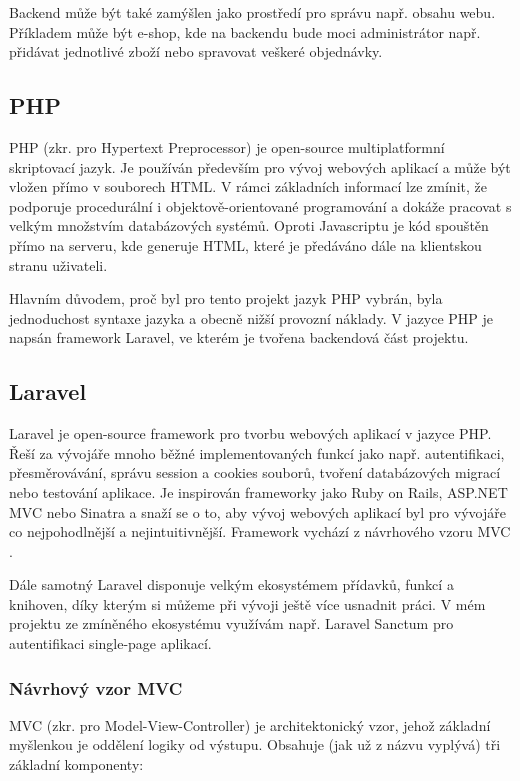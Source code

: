 Backend může být také zamýšlen jako prostředí pro správu např. obsahu webu. Příkladem může být e-shop, kde na backendu bude moci administrátor např. přidávat jednotlivé zboží nebo spravovat veškeré objednávky.  \cite{BE1} \cite{BE2}
	
	\subsection{PHP}
	PHP (zkr. pro Hypertext Preprocessor) je open-source multiplatformní skriptovací jazyk. Je používán především pro vývoj webových aplikací a může být vložen přímo v souborech HTML. V rámci základních informací lze zmínit, že podporuje procedurální i objektově-orientované programování a dokáže pracovat s velkým množstvím databázových systémů. Oproti Javascriptu je kód spouštěn přímo na serveru, kde generuje HTML, které je předáváno dále na klientskou stranu uživateli. \cite{PHP1} \cite{PHP2}
	
	Hlavním důvodem, proč byl pro tento projekt jazyk PHP vybrán, byla jednoduchost syntaxe jazyka a obecně nižší provozní náklady. V jazyce PHP je napsán framework Laravel, ve kterém je tvořena backendová část projektu.
	
	\subsection{Laravel}
	Laravel je open-source framework pro tvorbu webových aplikací v jazyce PHP. Řeší za vývojáře mnoho běžné implementovaných funkcí jako např. autentifikaci, přesměrovávání, správu session a cookies souborů, tvoření databázových migrací nebo testování aplikace. Je inspirován frameworky jako Ruby on Rails, ASP.NET MVC nebo Sinatra a snaží se o to, aby vývoj webových aplikací byl pro vývojáře co nejpohodlnější a nejintuitivnější. \cite{Laravel1} Framework vychází z návrhového vzoru MVC \cite{LaravelMVC}.
	
	Dále samotný Laravel disponuje velkým ekosystémem přídavků, funkcí a knihoven, díky kterým si můžeme při vývoji ještě více usnadnit práci. \cite{LaravelEco} V mém projektu ze zmíněného ekosystému využívám např. Laravel Sanctum pro autentifikaci single-page aplikací.
	
		\subsubsection{Návrhový vzor MVC}
		MVC (zkr. pro Model-View-Controller) je architektonický vzor, jehož základní myšlenkou je oddělení logiky od výstupu. Obsahuje (jak už z názvu vyplývá) tři základní komponenty:
		
